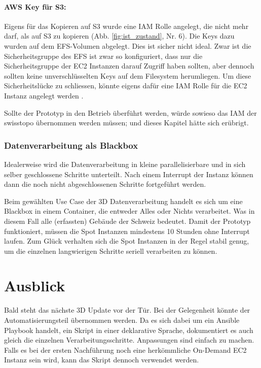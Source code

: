 \paragraph{AWS Key für S3:} Eigens für das Kopieren auf S3 wurde eine IAM Rolle angelegt, die nicht mehr darf, als auf S3 zu kopieren (Abb. \ref{fig:ist_zustand}, Nr. 6). Die Keys dazu wurden auf dem EFS-Volumen abgelegt. Dies ist sicher nicht ideal. Zwar ist die Sicherheitsgruppe des EFS ist zwar so konfiguriert, dass nur die Sicherheitsgruppe der EC2 Instanzen darauf Zugriff haben sollten, aber dennoch sollten keine unverschlüsselten Keys auf dem Filesystem herumliegen.
Um diese Sicherheitslücke zu schliessen, könnte eigens dafür eine IAM Rolle für die EC2 Instanz angelegt werden \cite{IAMEC2}.

Sollte der Prototyp in den Betrieb überführt werden, würde sowieso das IAM der swisstopo übernommen werden müssen; und dieses Kapitel hätte sich erübrigt.

\subsubsection{Datenverarbeitung als Blackbox}
Idealerweise wird die Datenverarbeitung in kleine parallelisierbare und in sich selber geschlossene Schritte unterteilt. Nach einem Interrupt der Instanz können dann die noch nicht abgeschlossenen Schritte fortgeführt werden. 

Beim gewählten Use Case der 3D Datenverarbeitung handelt es sich um eine Blackbox in einem Container, die entweder Alles oder Nichts verarbeitet. Was in diesem Fall alle (erfassten) Gebäude der Schweiz bedeutet. Damit der Prototyp funktioniert, müssen die Spot Instanzen mindestens 10 Stunden ohne Interrupt laufen. Zum Glück verhalten sich die Spot Instanzen in der Regel stabil genug, um die einzelnen langwierigen Schritte seriell verarbeiten zu können.

\section{Ausblick}
Bald steht das nächste 3D Update vor der Tür. Bei der Gelegenheit könnte der Automatisierungsteil übernommen werden. Da es sich dabei um ein Ansible Playbook handelt, ein Skript in einer deklarative Sprache, dokumentiert es auch gleich die einzelnen Verarbeitungsschritte. Anpassungen sind einfach zu machen. Falls es bei der ersten Nachführung noch eine herkömmliche On-Demand EC2 Instanz sein wird, kann das Skript dennoch verwendet werden.

